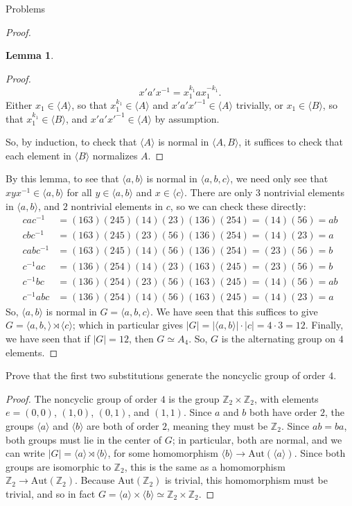 \documentclass[12pt]{article}
\newcommand{\Z}{\mathbb{Z}}
\theoremstyle{definition}
\newtheorem{lemma}{Lemma}
\newenvironment{problem}[2][Problem]{\begin{trivlist}
\item[\hskip \labelsep {\bfseries #1}\hskip \labelsep {\bfseries #2.}]}{\end{trivlist}}
\begin{document}
\begin{section}{Problems}
\begin{problem}{1}
\begin{proof}
\begin{lemma}
\begin{proof}
				\[x'a'x^{-1} = x_1^{k_1}ax_1^{-k_1}.\]
				Either $x_1 \in \langle A\rangle$, so that $x_1^{k_1} \in \langle A\rangle$ and $x'a'x'^{-1} \in \langle A\rangle$ trivially, or $x_1 \in \langle B\rangle$, so that $x_1^{k_1} \in \langle B\rangle$, and $x'a'x'^{-1} \in \langle A\rangle$ by assumption. 
				\par So, by induction, to check that $\langle A\rangle$ is normal in $\langle A, B\rangle$, it suffices to check that each element in $\langle B\rangle$ normalizes $A$.
			\end{proof}
		\end{lemma}
		By this lemma, to see that $\langle a, b\rangle $ is normal in $\langle a, b, c\rangle$, we need only see that $xyx^{-1} \in \langle a, b\rangle$ for all $y \in \langle a, b\rangle$ and $x \in \langle c\rangle$. There are only $3$ nontrivial elements in $\langle a, b\rangle$, and $2$ nontrivial elements in $c$, so we can check these directly:
		\begin{align*}
			cac^{-1} &= (163)(245)(14)(23)(136)(254) = (14)(56) = ab\\
			cbc^{-1} &= (163)(245)(23)(56)(136)(254) = (14)(23) = a\\
			cabc^{-1} &= (163)(245)(14)(56)(136)(254) = (23)(56) = b\\
			c^{-1}ac &= (136)(254)(14)(23)(163)(245) = (23)(56) = b\\
			c^{-1}bc &= (136)(254)(23)(56)(163)(245) = (14)(56) = ab\\
			c^{-1}abc &= (136)(254)(14)(56)(163)(245) = (14)(23) = a
		\end{align*}
		So, $\langle a, b\rangle$ is normal in $ G = \langle a, b, c\rangle$. We have seen that this suffices to give $G = \langle a, b, \rangle \rtimes \langle c\rangle$; which in particular gives $\left \lvert {  G } \right \lvert  = \left \lvert { \langle a, b\rangle } \right \lvert \cdot \left \lvert { c } \right \lvert = 4 \cdot 3 = 12$. Finally, we have seen that if $\left \lvert { G } \right \lvert  = 12$, then $G \simeq A_4$. So, $G$ is the alternating group on $4$ elements.
	\end{proof}
	Prove that the first two substitutions generate the noncyclic group of order $4$.	
	\begin{proof}
		The noncyclic group of order $4$ is the group $\Z_2 \times \Z_2$, with elements $e = (0,0)$, $(1,0)$, $(0,1)$, and $(1,1)$. Since $a$ and $b$ both have order $2$, the groups $\langle a\rangle$ and $\langle b\rangle$ are both of order $2$, meaning they must be $\Z_2$. Since $ab = ba$, both groups must lie in the center of $G$; in particular, both are normal, and we can write $\left \lvert { G } \right \lvert  = \langle a \rangle \rtimes \langle b\rangle$, for some homomorphism $\langle b\rangle \to \text{Aut}(\langle a\rangle)$. Since both groups are isomorphic to $\Z_2$, this is the same as a homomorphism $\Z_2 \to \text{Aut}(\Z_2)$. Because $\text{Aut}(\Z_2)$ is trivial, this homomorphism must be trivial, and so in fact  $G = \langle a\rangle \times \langle b\rangle \simeq \Z_2 \times \Z_2$.

\end{proof}
\end{problem}
\end{section}
\end{document}
